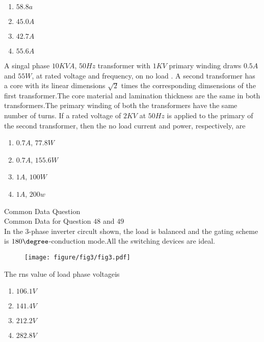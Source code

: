     \begin{enumerate}
        \item$58.8 a$\\
        \item$45.0 A$\\
        \item$42.7 A$\\
        \item$55.6 A$
    \end{enumerate}
    \item A singal phase $10 KV A$, $50 Hz$ transformer with $1 KV$ primary winding draws $0.5 A$ and $55 W$, at rated voltage and frequency, on no load . A second transformer has a core with its linear dimensions $\sqrt{2}$ times the corresponding dimsensions of the first transformer.The core material and lamination thickness are the same in both transformers.The primary winding of both the transformers have the same number of turns. If a rated voltage of $2 KV$ at $50 Hz$ is applied to the primary of the second transformer, then the no load current and power, respectively, are\\
    \begin{enumerate}
        \item$0.7 A$, $77.8 W$\\
        \item$0.7 A$, $155.6 W$\\
        \item$1 A$, $100 W$\\
        \item$1 A$, $200 w$
    \end{enumerate}
    Common Data Question\\
    Common Data for Question $48$ and $49$\\
    In the 3-phase inverter circult shown, the load is balanced and the gating scheme is $180\degree$-conduction mode.All the switching devices are ideal.
    \begin{figure}[h!]
        \centering
        \texttt{[image: figure/fig3/fig3.pdf]}
		\caption{}
        \label{stemplot}
\end{figure}
\item The rns value of load phase voltageis 
\begin{enumerate}
    \item$106.1 V$\\
    \item$141.4 V$\\
    \item$212.2 V$\\
    \item$282.8 V$
\end{enumerate}
